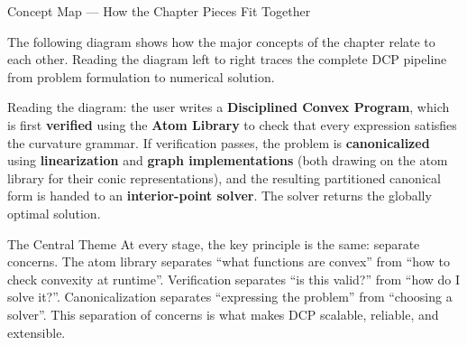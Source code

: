 \documentclass[aspectratio=169,10pt]{beamer}
\begin{document}
\begin{frame}[allowframebreaks]{Concept Map --- How the Chapter Pieces Fit Together}

  The following diagram shows how the major concepts of the chapter
  relate to each other.  Reading the diagram left to right traces the
  complete DCP pipeline from problem formulation to numerical solution.

  \begin{center}
  \end{center}

  \medskip
  Reading the diagram: the user writes a \textbf{Disciplined Convex
  Program}, which is first \textbf{verified} using the \textbf{Atom
  Library} to check that every expression satisfies the curvature
  grammar.  If verification passes, the problem is \textbf{canonicalized}
  using \textbf{linearization} and \textbf{graph implementations} (both
  drawing on the atom library for their conic representations), and the
  resulting partitioned canonical form is handed to an
  \textbf{interior-point solver}.  The solver returns the globally
  optimal solution.

  \begin{alertblock}{The Central Theme}
    At every stage, the key principle is the same: separate concerns.
    The atom library separates ``what functions are convex'' from ``how
    to check convexity at runtime''.  Verification separates ``is this
    valid?'' from ``how do I solve it?''.  Canonicalization separates
    ``expressing the problem'' from ``choosing a solver''.  This
    separation of concerns is what makes DCP scalable, reliable, and
    extensible.
  \end{alertblock}

\end{frame}
\end{document}
